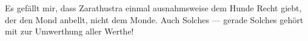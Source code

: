 Es gefällt mir, dass Zarathustra einmal ausnahmsweise dem Hunde Recht giebt, der den Mond anbellt, nicht dem Monde. Auch Solches — gerade Solches gehört mit zur Umwerthung aller Werthe!
\par

